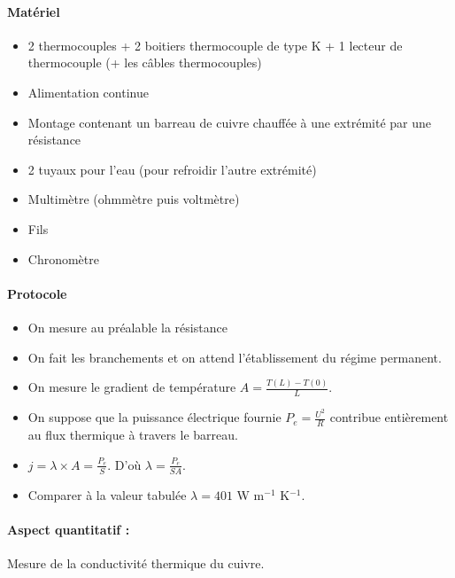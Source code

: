 \documentclass[11pt]{report}
\numberwithin{figure}{section}
\numberwithin{equation}{section}
\numberwithin{table}{section}
\newcommand{\1}{\boldsymbol{1}}
\begin{document}
\begin{tcolorbox}[breakable, enhanced, colback=red!2!white,colframe=mycolor!85!black,title=\textbf{\textbf{Expérience}}]
\paragraph*{Matériel}
\begin{itemize}
\item 2 thermocouples + 2 boitiers thermocouple de type K + 1 lecteur de thermocouple (+ les câbles thermocouples)
\item Alimentation continue
\item Montage contenant un barreau de cuivre chauffée à une extrémité par une résistance
\item 2 tuyaux pour l'eau (pour refroidir l'autre extrémité)
\item Multimètre (ohmmètre puis voltmètre)
\item Fils
\item Chronomètre
\end{itemize}

\paragraph*{Protocole } 

\begin{itemize}[label=$\triangleright$]
		\item On mesure au préalable la résistance
		\item On fait les branchements  et on attend l'établissement du régime permanent.
		\item On mesure le gradient de température $A = \frac{T(L) - T(0)}{L}$.
		\item On suppose que la puissance électrique fournie $P_e = \frac{U^2}{R}$  contribue entièrement au flux thermique à travers le barreau.
		\item $j = \lambda \times A = \frac{P_e}{S}$. D'où $\lambda = \frac{P_e}{S A}$. 
		\item Comparer à la valeur tabulée $\lambda = 401$ W m$^{-1}$ K$^{-1}$.
\end{itemize}

\paragraph*{Aspect quantitatif :} Mesure de la conductivité thermique du cuivre.


\end{tcolorbox}
\end{document}
